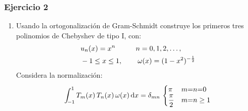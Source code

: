 \documentclass[12pt]{beamer}
\begin{document}
\begin{frame}
\frametitle{Ejercicio 2}
\begin{enumerate}[<+->]
\conti
\item Usando la ortogonalización de Gram-Schmidt construye los primeros tres polinomios de Chebyshev de tipo I, con:
\begin{align*}
&u_{n} (x) = x^{n} \hspace{1cm} n = 0, 1, 2, \ldots, \\
&-1 \leq x \leq 1, \hspace{0.75cm} \omega(x) = (1 - x^{2})^{-\frac{1}{2}}
\end{align*}
Considera la normalización:
\begin{align*}
\scaleint{5ex}_{\bs -1}^{1} \, T_{m}(x) \, T_{n}(x) \, \omega(x) \dd{x} = \delta_{mn} \, \begin{cases}
\pi & m {=} n {=} 0 \\
\dfrac{\pi}{2} & m {=} n \geq 1
\end{cases}
\end{align*}
\seti
\end{enumerate}
\end{frame}
\end{document}
